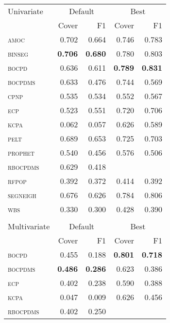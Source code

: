 \begin{tabular}{lrrrr}
Univariate & \multicolumn{2}{c}{Default} & \multicolumn{2}{c}{Best} \\
 & Cover & F1 & Cover & F1 \\
\hline
\textsc{amoc} & 0.702 & 0.664 & 0.746 & 0.783 \\
\textsc{binseg} & \textbf{0.706} & \textbf{0.680} & 0.780 & 0.803 \\
\textsc{bocpd} & 0.636 & 0.611 & \textbf{0.789} & \textbf{0.831} \\
\textsc{bocpdms} & 0.633 & 0.476 & 0.744 & 0.569 \\
\textsc{cpnp} & 0.535 & 0.534 & 0.552 & 0.567 \\
\textsc{ecp} & 0.523 & 0.551 & 0.720 & 0.706 \\
\textsc{kcpa} & 0.062 & 0.057 & 0.626 & 0.589 \\
\textsc{pelt} & 0.689 & 0.653 & 0.725 & 0.703 \\
\textsc{prophet} & 0.540 & 0.456 & 0.576 & 0.506 \\
\textsc{rbocpdms} & 0.629 & 0.418 &       &       \\
\textsc{rfpop} & 0.392 & 0.372 & 0.414 & 0.392 \\
\textsc{segneigh} & 0.676 & 0.626 & 0.784 & 0.806 \\
\textsc{wbs} & 0.330 & 0.300 & 0.428 & 0.390 \\
\hline
& & & & \\
Multivariate & \multicolumn{2}{c}{Default} & \multicolumn{2}{c}{Best} \\
 & Cover & F1 & Cover & F1 \\
\hline
\textsc{bocpd} & 0.455 & 0.188 & \textbf{0.801} & \textbf{0.718} \\
\textsc{bocpdms} & \textbf{0.486} & \textbf{0.286} & 0.623 & 0.386 \\
\textsc{ecp} & 0.402 & 0.238 & 0.590 & 0.388 \\
\textsc{kcpa} & 0.047 & 0.009 & 0.626 & 0.456 \\
\textsc{rbocpdms} & 0.402 & 0.250 &       &       \\
\hline
\end{tabular}
